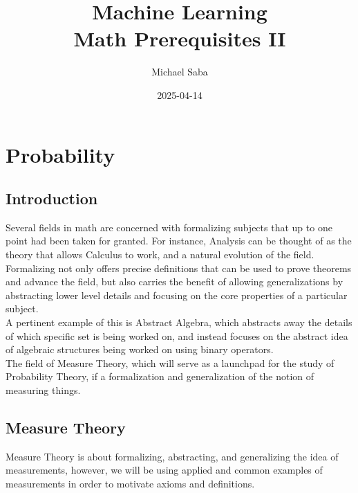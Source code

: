 \documentclass[12pt]{article}
\title{%
    \Huge Machine Learning \\
    \Large Math Prerequisites II
}
\date{2025-04-14}
\author{Michael Saba}
\begin{document}
\maketitle
\newpage
\setlength{\parindent}{0pt}

    \section*{Probability}

    \subsection*{Introduction}

    Several fields in math are concerned with
    formalizing subjects that up to one point
    had been taken for granted.
    For instance, Analysis can be thought of as
    the theory that allows Calculus to work,
    and a natural evolution of the field. \\
    
    Formalizing not only offers precise definitions
    that can be used to prove theorems and
    advance the field,
    but also carries the benefit of 
    allowing generalizations by abstracting
    lower level details and focusing on the core
    properties of a particular subject. \\
    A pertinent example of this is Abstract Algebra,
    which abstracts away the details of which specific
    set is being worked on,
    and instead focuses on the abstract idea of
    algebraic structures being worked on using binary
    operators. \\

    The field of Measure Theory,
    which will serve as a launchpad for the study
    of Probability Theory,
    if a formalization and generalization of the
    notion of measuring things. \\

    \newpage

    \subsection*{Measure Theory}

    Measure Theory is about formalizing,
    abstracting, and generalizing the idea of
    measurements, however, we will be using 
    applied and common examples of measurements
    in order to motivate axioms and definitions. \\
\end{document}
